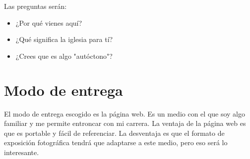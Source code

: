\documentclass[11pt]{article}
\begin{document}
Las preguntas serán:
\begin{itemize}
\item ¿Por qué vienes aquí?
\item ¿Qué significa la iglesia para tí?
\item ¿Crees que es algo "autóctono"?
\end{itemize}

\section{Modo de entrega}
\label{sec-5}
El modo de entrega escogido es la página web. Es un medio con el que soy algo familiar y me permite entroncar 
con mi carrera. La ventaja de la página web es que es portable y fácil de referenciar. La desventaja 
es que el formato de exposición fotográfica tendrá que adaptarse a este medio, pero eso será lo interesante.


\nocite{*}
\end{document}
